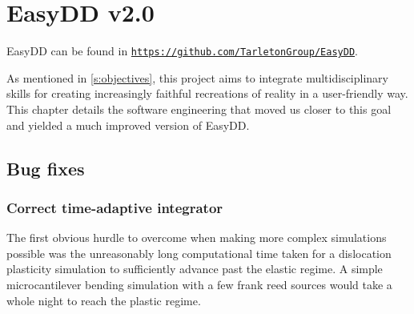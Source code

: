 \chapter{EasyDD v2.0}
\label{c:easydd}

EasyDD can be found in \href{https://github.com/TarletonGroup/EasyDD}{\texttt{https://github.com/TarletonGroup/EasyDD}}.

As mentioned in \cref{s:objectives}, this project aims to integrate multidisciplinary skills for creating increasingly faithful recreations of reality in a user-friendly way. This chapter details the software engineering that moved us closer to this goal and yielded a much improved version of EasyDD.

\section{Bug fixes}
\label{s:bugs}

\subsection{Correct time-adaptive integrator}
\label{ss:integrator}

The first obvious hurdle to overcome when making more complex simulations possible was the unreasonably long computational time taken for a dislocation plasticity simulation to sufficiently advance past the elastic regime. A simple microcantilever bending simulation with a few frank reed sources would take a whole night to reach the plastic regime.

